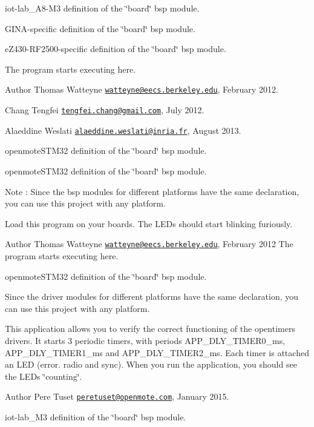 iot-\/lab\+\_\+\+A8-\/\+M3 definition of the \char`\"{}board\char`\"{} bsp module.

G\+I\+N\+A-\/specific definition of the \char`\"{}board\char`\"{} bsp module.

e\+Z430-\/\+R\+F2500-\/specific definition of the \char`\"{}board\char`\"{} bsp module.

The program starts executing here.

\begin{DoxyAuthor}{Author}
Thomas Watteyne \href{mailto:watteyne@eecs.berkeley.edu}{\tt watteyne@eecs.\+berkeley.\+edu}, February 2012. 

Chang Tengfei \href{mailto:tengfei.chang@gmail.com}{\tt tengfei.\+chang@gmail.\+com}, July 2012. 

Alaeddine Weslati \href{mailto:alaeddine.weslati@inria.fr}{\tt alaeddine.\+weslati@inria.\+fr}, August 2013.
\end{DoxyAuthor}
openmote\+S\+T\+M32 definition of the \char`\"{}board\char`\"{} bsp module.

openmote\+S\+T\+M32 definition of the \char`\"{}board\char`\"{} bsp module.

\begin{DoxyNote}{Note}
\+: Since the bsp modules for different platforms have the same declaration, you can use this project with any platform.
\end{DoxyNote}
Load this program on your boards. The L\+E\+Ds should start blinking furiously.

\begin{DoxyAuthor}{Author}
Thomas Watteyne \href{mailto:watteyne@eecs.berkeley.edu}{\tt watteyne@eecs.\+berkeley.\+edu}, February 2012 The program starts executing here.
\end{DoxyAuthor}
openmote\+S\+T\+M32 definition of the \char`\"{}board\char`\"{} bsp module.

Since the driver modules for different platforms have the same declaration, you can use this project with any platform.

This application allows you to verify the correct functioning of the opentimers drivers. It starts 3 periodic timers, with periods A\+P\+P\+\_\+\+D\+L\+Y\+\_\+\+T\+I\+M\+E\+R0\+\_\+ms, A\+P\+P\+\_\+\+D\+L\+Y\+\_\+\+T\+I\+M\+E\+R1\+\_\+ms and A\+P\+P\+\_\+\+D\+L\+Y\+\_\+\+T\+I\+M\+E\+R2\+\_\+ms. Each timer is attached an L\+ED (error. radio and sync). When you run the application, you should see the L\+E\+Ds \char`\"{}counting\char`\"{}.

\begin{DoxyAuthor}{Author}
Pere Tuset \href{mailto:peretuset@openmote.com}{\tt peretuset@openmote.\+com}, January 2015.
\end{DoxyAuthor}
iot-\/lab\+\_\+\+M3 definition of the \char`\"{}board\char`\"{} bsp module.

